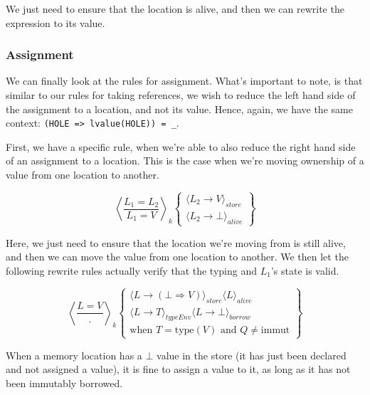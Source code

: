 \documentclass[review,twocolumn]{sigplanconf}
\begin{document}
We just need to ensure that the location is alive, and then we can rewrite the expression to its value.

\subsubsection*{Assignment}

We can finally look at the rules for assignment. What's important to note, is that similar to our rules for taking references, we wish to reduce the left hand side of the assignment to a location, and not its value. Hence, again, we have the same context: \verb!(HOLE => lvalue(HOLE)) = _!.

First, we have a specific rule, when we're able to also reduce the right hand side of an assignment to a location. This is the case when we're moving ownership of a value from one location to another.

\begin{small}
  \[
    \left\langle
    \frac{ L_1 = L_2 }{ L_1 = V }
    \right\rangle _k
    \left\{
    \begin{array}{l}
      \langle L_2 \rightarrow V \rangle_{store} \\
      \langle L_2 \rightarrow \bot \rangle_{alive}
    \end{array}
    \right\}
  \]
\end{small}

Here, we just need to ensure that the location we're moving from is still alive, and then we can move the value from one location to another. We then let the following rewrite rules actually verify that the typing and $L_1$'s state is valid.

\begin{small}
  \[
    \left\langle
    \frac{ L = V }{ . }
    \right\rangle _k
    \left\{
    \begin{array}{l}
      \langle L \rightarrow (\bot \Rightarrow V) \rangle_{store} \langle L \rangle_{alive}  \\
      \langle L \rightarrow T \rangle_{typeEnv} \langle L \rightarrow \bot \rangle_{borrow} \\
      \text{when } T = \text{type}(V) \text{ and } Q \neq \text{immut}
    \end{array}
    \right\}
  \]
\end{small}

When a memory location has a $\bot$ value in the store (it has just been declared and not assigned a value), it is fine to assign a value to it, as long as it has not been immutably borrowed.
\end{document}
